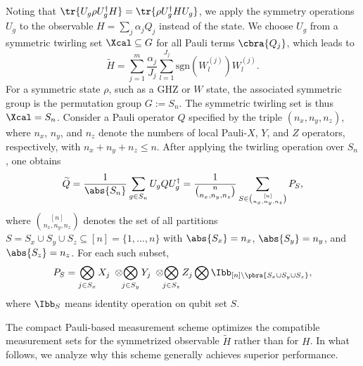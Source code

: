 \documentclass[prl,aps,notitlepage,superscriptaddress,showpacs,nofootinbib]{revtex4-2}
\begin{document}
Noting that $\tr{U_g \rho U_g^\dagger H} = \tr{\rho U_g^\dagger H U_g}$, we apply the symmetry operations $U_g$ to the observable $H=\sum_j \alpha_j Q_j$ instead of the state. 
We choose $U_g$ from a symmetric twirling set $\Xcal \subseteq G$ for all Pauli terms $\cbra{Q_j}$, which leads to
\begin{equation}
    \widetilde{H} = \sum_{j=1}^{m} \frac{\alpha_j}{J_j} \sum_{l=1}^{J_j} \text{sgn}(W_l^{(j)}) W_l^{(j)}.
    \label{eq:compact_hamiltonian}
\end{equation}
For a symmetric state $\rho$, such as a GHZ or $W$ state, the associated symmetric group is the permutation group $G := S_n$. The symmetric twirling set is thus $\Xcal = S_n$. Consider a Pauli operator $Q$ specified by the triple $(n_x,n_y,n_z)$, where $n_x$, $n_y$, and $n_z$ denote the numbers of local Pauli-$X$, $Y$, and $Z$ operators, respectively, with $n_x+n_y+n_z \leq n$. After applying the twirling operation over $S_n$, one obtains  
\begin{equation}
    \widetilde{Q} = \frac{1}{\abs{S_n}} \sum_{g \in S_n} U_g Q U_g^\dagger 
    = \frac{1}{{n \choose n_x, n_y, n_z}} 
    \sum_{S \in {[n] \choose n_x, n_y, n_z}} P_S ,
\end{equation}
where ${[n] \choose n_x, n_y, n_z}$ denotes the set of all partitions 
$S = S_x \cup S_y \cup S_z \subseteq [n] = \{1,\ldots,n\}$ with 
$\abs{S_x}=n_x$, $\abs{S_y}=n_y$, and $\abs{S_z}=n_z$. For each such subset,   
\begin{equation}
     P_S = \bigotimes_{j\in S_x} X_j \;\otimes\!\!\bigotimes_{j\in S_y} Y_j \;\otimes\!\!\bigotimes_{j\in S_z} Z_j\bigotimes\Ibb_{{ [n]\backslash\pbra{S_x\cup S_y \cup S_z}}},
\end{equation}
where $\Ibb_S$ means identity operation on qubit set $S$.


 

The compact Pauli-based measurement scheme optimizes the compatible measurement sets for the symmetrized observable $\widetilde{H}$ rather than for $H$. In what follows, we analyze why this scheme generally achieves superior performance.




\end{document}
